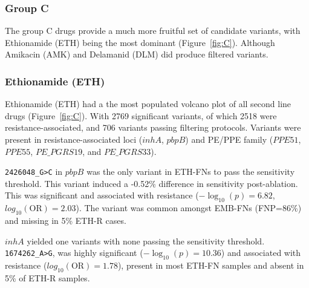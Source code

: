 \subsubsection{Group C}

The group C drugs provide a much more fruitful set of candidate variants, with Ethionamide (ETH) being the most dominant (Figure~\ref{fig:C}). Although Amikacin (AMK) and Delamanid (DLM) did produce filtered variants. 

\subsubsection{Ethionamide (ETH)}

Ethionamide (ETH) had a the most populated volcano plot of all second line drugs (Figure~\ref{fig:C}). With 2769 significant variants, of which 2518 were resistance-associated, and 706 variants passing filtering protocols. Variants were present in resistance-associated loci ($inhA$, $pbpB$) and PE/PPE family ($PPE51$, $PPE55$, $PE\_PGRS19$, and $PE\_PGRS33$). 

\texttt{2426048\_G>C} in $pbpB$ was the only variant in ETH-FNs to pass the sensitivity threshold. This variant induced a -0.52\% difference in sensitivity post-ablation. This was significant and associated with resistance ($-\log_{10}(p)=6.82$, $log_{10}(\text{OR})=2.03$). The variant was common amongst EMB-FNs (FNP=86\%) and missing in 5\% ETH-R cases.

$inhA$ yielded one variants with none passing the sensitivity threshold. \texttt{1674262\_A>G}, was highly significant ($-\log_{10}(p)=10.36$) and associated with resistance ($log_{10}(\text{OR})=1.78$), present in most ETH-FN samples and absent in 5\% of ETH-R samples. 

